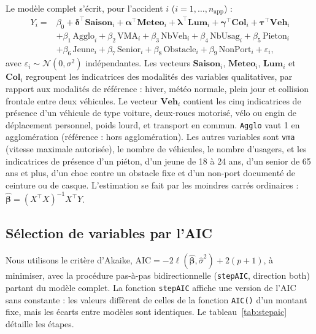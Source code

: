 \documentclass[11pt,a4paper]{article}
\begin{document}
Le modèle complet s'écrit, pour l'accident $i$ ($i = 1, \dots, n_{\text{app}}$) :
\begin{equation}
\begin{split}
Y_i ={}& \beta_0 + \boldsymbol{\delta}^{\top}\mathbf{Saison}_i + \boldsymbol{\alpha}^{\top}\mathbf{Meteo}_i + \boldsymbol{\lambda}^{\top}\mathbf{Lum}_i + \boldsymbol{\gamma}^{\top}\mathbf{Col}_i + \boldsymbol{\tau}^{\top}\mathbf{Veh}_i \\
&+ \beta_1\,\mathrm{Agglo}_i + \beta_2\,\mathrm{VMA}_i + \beta_3\,\mathrm{NbVeh}_i + \beta_4\,\mathrm{NbUsag}_i + \beta_5\,\mathrm{Pieton}_i \\
&+ \beta_6\,\mathrm{Jeune}_i + \beta_7\,\mathrm{Senior}_i + \beta_8\,\mathrm{Obstacle}_i + \beta_9\,\mathrm{NonPort}_i + \varepsilon_i,
\end{split}
\end{equation}
avec $\varepsilon_i \sim \mathcal{N}(0, \sigma^2)$ indépendantes. Les vecteurs $\mathbf{Saison}_i$, $\mathbf{Meteo}_i$, $\mathbf{Lum}_i$ et $\mathbf{Col}_i$ regroupent les indicatrices des modalités des variables qualitatives, par rapport aux modalités de référence : hiver, météo normale, plein jour et collision frontale entre deux véhicules. Le vecteur $\mathbf{Veh}_i$ contient les cinq indicatrices de présence d'un véhicule de type voiture, deux-roues motorisé, vélo ou engin de déplacement personnel, poids lourd, et transport en commun. \texttt{Agglo} vaut 1 en agglomération (référence : hors agglomération). Les autres variables sont \texttt{vma} (vitesse maximale autorisée), le nombre de véhicules, le nombre d'usagers, et les indicatrices de présence d'un piéton, d'un jeune de 18 à 24 ans, d'un senior de 65 ans et plus, d'un choc contre un obstacle fixe et d'un non-port documenté de ceinture ou de casque. L'estimation se fait par les moindres carrés ordinaires : $\hat{\boldsymbol{\beta}} = (X^{\top}X)^{-1}X^{\top}Y$.

\subsection{Sélection de variables par l'AIC}
Nous utilisons le critère d'Akaike, $\text{AIC} = -2\ell(\hat{\boldsymbol{\beta}}, \hat{\sigma}^2) + 2(p+1)$, à minimiser, avec la procédure pas-à-pas bidirectionnelle (\texttt{stepAIC}, direction \og both\fg{}) partant du modèle complet. La fonction \texttt{stepAIC} affiche une version de l'AIC sans constante : les valeurs diffèrent de celles de la fonction \texttt{AIC()} d'un montant fixe, mais les écarts entre modèles sont identiques. Le tableau~\ref{tab:stepaic} détaille les étapes.
\end{document}

